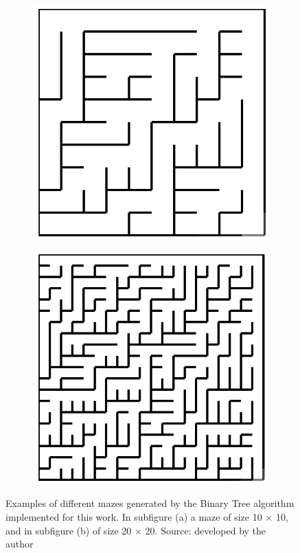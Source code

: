 \begin{figure}[!h]
	\centering
	\begin{subfigure}{.45\textwidth}
	  \centering
	  \includegraphics[width=.6\linewidth]{binary1010}
	  \caption{}
	  \label{fig:sub1}
	\end{subfigure}
	\begin{subfigure}{.45\textwidth}
	  \centering
	  \includegraphics[width=.6\linewidth]{binary2020}
	  \caption{}
	  \label{fig:sub2}
	\end{subfigure}
	\caption{Examples of different mazes generated by the Binary Tree algorithm implemented for this work. In subfigure (a) a maze of size 10 $\times$ 10, and in subfigure (b) of size 20 $\times$ 20. Source: developed by the author}
	\label{fig:test}
	\end{figure}
\newline
\\
\\
\\
\newpage
